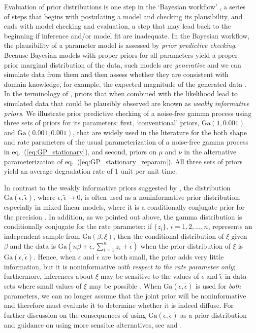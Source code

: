 \documentclass{article}
\begin{document}
Evaluation of prior distributions is one step in the `Bayesian workflow' \citep[Figure ~1]{gelman_bayesian_2020}, a series of steps that begins with postulating a model and checking its plausibility, and ends with model checking and evaluation, a step that may lead back to the beginning if inference and/or model fit are inadequate. In the Bayesian workflow, the plausibility of a parameter model is assessed by \emph{prior predictive checking}. Because Bayesian models with proper priors for all parameters yield a proper prior marginal distribution of the data, such models are \emph{generative} and we can simulate data from them and then assess whether they are consistent with domain knowledge, for example, the expected magnitude of the generated data \citep{gabry_vis_2019}. In the terminology of \citet{gabry_vis_2019}, priors that when combined with the likelihood lead to simulated data that could be plausibly observed are known as \textit{weakly informative priors}. We illustrate prior predictive checking of a noise-free gamma process using three sets of priors for its parameters: first, `conventional' priors, $\mbox{Ga}(1, 0.001)$ and $\mbox{Ga}(0.001, 0.001)$, that are widely used in the literature for the both shape and rate parameters of the usual parameterization of a noise-free gamma process in eq.~(\ref{eq:GP_stationary}), and second, priors on $\mu$ and $\nu$ in the alternative parameterization of eq.~(\ref{eq:GP_stationary_reparam}). All three sets of priors yield an average degradation rate of 1 unit per unit time. 

In contrast to the weakly informative priors suggested by \citet{gabry_vis_2019}, the distribution $\mbox{Ga}(\epsilon, \tilde{\epsilon})$, where $\epsilon, \tilde{\epsilon}\longrightarrow 0$, is often used as a noninformative prior distribution, especially in mixed linear models, where it is a conditionally conjugate prior for the precision \citep[p.~33]{hodges_2014}. In addition, as we pointed out above, the gamma distribution is conditionally conjugate for the rate parameter: if $\{ z_i \}$, $i = 1, 2, \ldots, n$, represents an independent sample from $\mbox{Ga}(\beta, \xi)$, then the conditional distribution of $\xi$ given $\beta$ and the data is $\mbox{Ga}(n\beta + \epsilon, \sum_{i=1}^n z_i + \tilde{\epsilon})$ when the prior distribution of $\xi$ is $\mbox{Ga}(\epsilon, \tilde{\epsilon})$. Hence, when $\epsilon$ and $\tilde{\epsilon}$ are both small, the prior adds very little information, but it is noninformative \textit{with respect to the rate parameter only}; furthermore, inferences about $\xi$ may be sensitive to the values of $\epsilon$ and $\tilde{\epsilon}$ in data sets where small values of $\xi$ may be possible \citep[p.~130]{gelman_bayesian_2020}. When $\mbox{Ga}(\epsilon, \tilde{\epsilon})$ is used for \textit{both} parameters, we can no longer assume that the joint prior will be noninformative and therefore must evaluate it to determine whether it is indeed diffuse. For further discussion on the consequences of using $\mbox{Ga}(\epsilon, \tilde{\epsilon})$ as a prior distribution and guidance on using more sensible alternatives, see \citet{hodges_2014} and \citet{gelman_bayesian_2020}.
\end{document}
